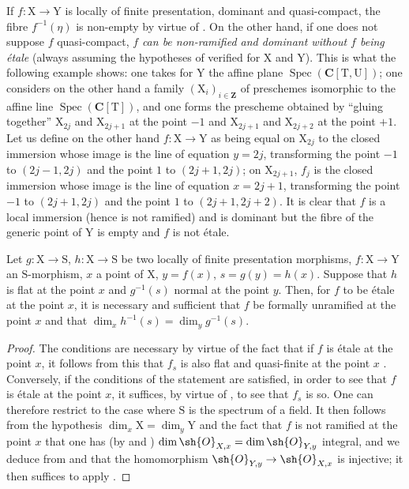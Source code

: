\begin{remark}[18.10.3.1]
\label{IV.18.10.3.1}
If $f:\mathrm{X}\to\mathrm{Y}$ is locally of finite presentation, dominant and quasi-compact, the fibre $f^{-1}(\eta)$ is non-empty by virtue of .
On the other hand, if one does not suppose $f$ quasi-compact, $f$ \emph{can be non-ramified and dominant without $f$ being \'etale} (always assuming the hypotheses of  verified for $\mathrm{X}$ and $\mathrm{Y}$).
This is what the following example shows: one takes for $\mathrm{Y}$ the affine plane $\operatorname{Spec}(\mathbf{C}[\mathrm{T},\mathrm{U}])$; one considers on the other hand a family $(\mathrm{X}_i)_{i\in\mathbf{Z}}$ of preschemes isomorphic to the affine line $\operatorname{Spec}(\mathbf{C}[\mathrm{T}])$, and one forms the prescheme obtained by ``gluing together'' $\mathrm{X}_{2j}$ and $\mathrm{X}_{2j+1}$ at the point $-1$ and $\mathrm{X}_{2j+1}$ and $\mathrm{X}_{2j+2}$ at the point $+1$.
Let us define on the other hand $f:\mathrm{X}\to\mathrm{Y}$ as being equal on $\mathrm{X}_{2j}$ to the closed immersion whose image is the line of equation $y=2j$, transforming the point $-1$ to $(2j-1,2j)$ and the point $1$ to $(2j+1,2j)$; on $\mathrm{X}_{2j+1}$, $f_j$ is the closed immersion whose image is the line of equation $x=2j+1$, transforming the point $-1$ to $(2j+1,2j)$ and the point $1$ to $(2j+1,2j+2)$.
It is clear that $f$ is a local immersion (hence is not ramified) and is dominant but the fibre of the generic point of $\mathrm{Y}$ is empty and $f$ is not \'etale.
\end{remark}

\begin{corollary}[18.10.4]
\label{IV.18.10.4}
Let $g:\mathrm{X}\to\mathrm{S}$, $h:\mathrm{X}\to\mathrm{S}$ be two locally of finite presentation morphisms, $f:\mathrm{X}\to\mathrm{Y}$ an $\mathrm{S}$-morphism, $x$ a point of $\mathrm{X}$, $y=f(x)$, $s=g(y)=h(x)$.
Suppose that $h$ is flat at the point $x$ and $g^{-1}(s)$ normal at the point $y$.
Then, for $f$ to be \'etale at the point $x$, it is necessary and sufficient that $f$ be formally unramified at the point $x$ and that $\dim_xh^{-1}(s)=\dim_yg^{-1}(s)$.
\end{corollary}

\begin{proof}
The conditions are necessary by virtue of the fact that if $f$ is \'etale at the point $x$, it follows from this that $f_s$ is also flat and quasi-finite at the point $x$ .
Conversely, if the conditions of the statement are satisfied, in order to see that $f$ is \'etale at the point $x$, it suffices, by virtue of , to see that $f_s$ is so.
One can therefore restrict to the case where $\mathrm{S}$ is the spectrum of a field.
It then follows from the hypothesis $\dim_x\mathrm{X}=\dim_y\mathrm{Y}$ and the fact that $f$ is not ramified at the point $x$ that one has (by  and ) $\dim\sh{O}_{X,x}=\dim\sh{O}_{Y,y}$ integral, and we deduce from  and  that the homomorphism $\sh{O}_{Y,y}\to\sh{O}_{X,x}$ is injective; it then suffices to apply .
\end{proof}

